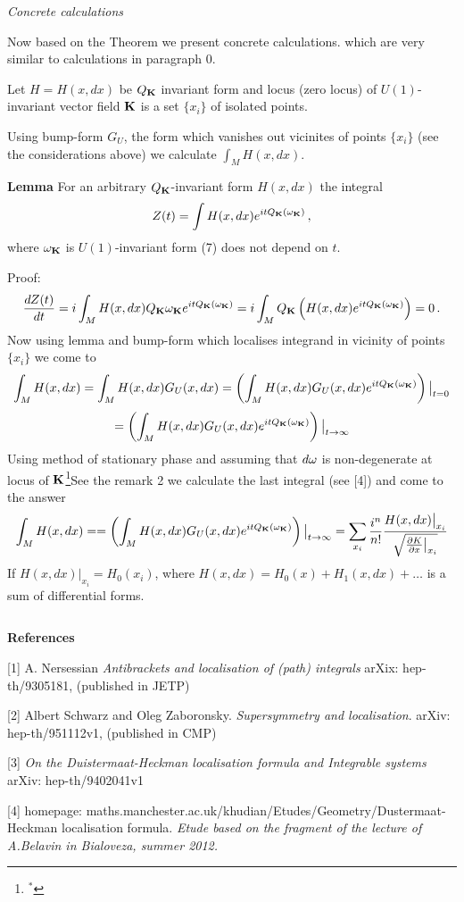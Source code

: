 \m

{\it Concrete calculations}

   Now based on the Theorem we present concrete calculations.
which are very similar to calculations in paragraph $0$.

Let $H=H(x,dx)$ be $Q_{\bf K}$ invariant form and 
locus (zero locus)
of $U(1)$-invariant 
vector field ${\bf K}$ is a set $\{x_i\}$ of isolated points.

Using bump-form $G_U$, the form which vanishes out vicinites of
points $\{x_i\}$ (see the considerations above) we calculate
$\int_M H(x,dx)$.


 {\bf Lemma}  For an arbitrary $Q_{\bf K}$-invariant form $H(x,dx)$ the integral
            $$
   Z(t)=\int H(x,dx)e^{itQ_{\bf K}({\omega}_{\bf K})}\,, 
            $$
where ${\omega}_{\bf K}$ is $U(1)$-invariant form 
(7) does not depend on $t$.

  Proof:
              $$
 {dZ(t)\over dt}=
           i\int_M 
  H(x,dx)Q_{\bf K}
   {\omega}_{\bf K}
  e^{itQ_{\bf K}({\omega}_{\bf K})}=
    i\int_M Q_{\bf K}
          \left(
  H(x,dx)e^{itQ_{\bf K}({\omega}_{\bf K})}
          \right)=0\,.
              $$
Now using lemma and bump-form which localises integrand in vicinity of
points $\{x_i\}$ we come to 
           $$
\int_M H(x,dx)=\int_M H(x,dx)G_U(x,dx)=
\left(
\int_M H(x,dx)G_U(x,dx)e^{itQ_{\bf K}({\omega}_{\bf K})}\right)
\big\vert_{t=0}
             $$
             $$
              =
\left(\int_M H(x,dx)G_U(x,dx)e^{itQ_{\bf K}({\omega}_{\bf K})}\right)
\big\vert_{t\to\infty}
           $$ 
Using method of stationary phase and assuming that $d{\omega}$ is non-degenerate
at locus of ${\bf K}$\footnote{$^*$}{See the remark 2}  we calculate the last integral
(see [4]) and come to the answer
           $$
\int_M H(x,dx)=
              =
\left(\int_M H(x,dx)G_U(x,dx)e^{itQ_{\bf K}({\omega}_{\bf K})}\right)
\big\vert_{t\to\infty}=
\sum_{x_i}{i^n\over n!}{H(x,dx)\big\vert_{x_i}\over 
  \sqrt  {{\partial K\over \partial x}\big\vert_{x_i}} }
           $$ 
If $H(x,dx)\big\vert_{x_i}=H_0(x_i)$, where
$H(x,dx)=H_0(x)+H_1(x,dx)+\dots$ is a sum of differential forms. 
 

$$ $$

\centerline {\bf References}

 [1]  A. Nersessian {\it Antibrackets and localisation of (path) integrals
                    }
   arXix: hep-th/9305181, (published in JETP)
\m

 [2] Albert Schwarz and Oleg Zaboronsky. 
 {\it Supersymmetry and localisation}. arXiv: hep-th/951112v1,
  (published in CMP)


 \m


        
 [3] {\it On the Duistermaat-Heckman localisation 
 formula and Integrable systems} 
arXiv: hep-th/9402041v1

\m


 [4] homepage: maths.manchester.ac.uk/khudian/Etudes/Geometry/Dustermaat-Heckman  localisation formula. 
{\it Etude based on the fragment of the lecture of 
A.Belavin in Bialoveza, summer 2012.} 

\bye
